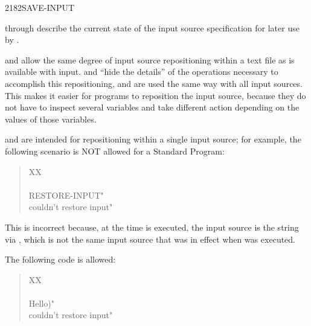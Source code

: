 \begin{worddef}{2182}{SAVE-INPUT}
\item {}

	 through  describe the current state of the
	input source specification for later use by .

	\begin{defer}
	\rationale %
		 and  allow the same
		degree of input source repositioning within a text file as is
		available with  input. 
		and  ``hide the details'' of the operations
		necessary to accomplish this repositioning, and are used the
		same way with all input sources. This makes it easier for
		programs to reposition the input source, because they do not
		have to inspect several variables and take different action
		depending on the values of those variables.

		 and  are intended for
		repositioning within a single input source; for example, the
		following scenario is NOT allowed for a Standard Program:

		\begin{quote}\ttfamily
			\word{:} XX \\
			\tab {} ~  \\
			\tab {} RESTORE-INPUT"  \\
			\tab {} couldn't restore input" \\
			\word{;}
		\end{quote}

		This is incorrect because, at the time  is
		executed, the input source is the string via ,
		which is not the same input source that was in effect when
		 was executed.

		The following code is allowed:

		\begin{quote}\ttfamily
			\word{:} XX \\
			\tab {} ~  \\
			\tab {}  Hello)"  \\
			\tab {}  couldn't restore input" \\
			\word{;}
		\end{quote}


\end{defer}
\end{worddef}
